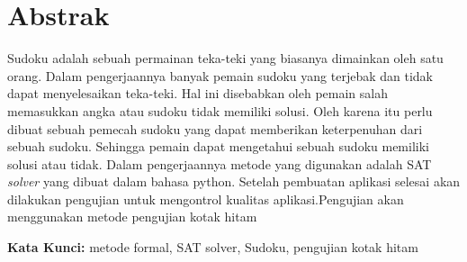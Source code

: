 \chapter*{Abstrak}

Sudoku adalah sebuah permainan teka-teki yang biasanya dimainkan oleh satu orang. Dalam pengerjaannya banyak pemain sudoku yang terjebak dan tidak dapat menyelesaikan teka-teki. Hal ini disebabkan oleh pemain salah memasukkan angka atau sudoku tidak memiliki solusi. Oleh karena itu perlu dibuat sebuah pemecah sudoku yang dapat memberikan keterpenuhan dari sebuah sudoku. Sehingga pemain dapat mengetahui sebuah sudoku memiliki solusi atau tidak. Dalam pengerjaannya metode yang digunakan adalah SAT \textit{solver} yang dibuat dalam bahasa python. Setelah pembuatan aplikasi selesai akan dilakukan pengujian untuk mengontrol kualitas aplikasi.Pengujian akan menggunakan metode pengujian kotak hitam
  
\vspace{0.5 cm}
\begin{flushleft}
{\textbf{Kata Kunci:}  metode formal, SAT solver, Sudoku, pengujian kotak hitam }
\end{flushleft}